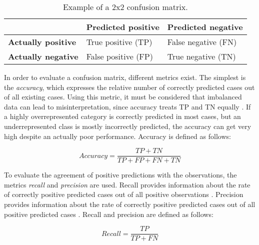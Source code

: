 \begin{table}[H]
\begin{center}
\caption[Example of a 2x2 confusion matrix]{Example of a 2x2 confusion matrix.}
\label{table:conf_matrix_example}
\begin{tabularx}{0.5\textwidth} {
    | >{\centering\arraybackslash}X 
    | >{\centering\arraybackslash}X 
    | >{\centering\arraybackslash}X | }
\hline
& \textbf{Predicted \break positive} & \textbf{Predicted \break negative} \\
\hline
\textbf{Actually \break positive} &
\cellcolor[HTML]{CCFFCC} True positive (TP) & %
\cellcolor[HTML]{FFCCCC} False negative (FN) \\  %
\hline
\textbf{Actually \break negative} &
\cellcolor[HTML]{FFCCCC} False positive (FP) &  %
\cellcolor[HTML]{CCFFCC} True negative (TN) \\ %
\hline
\end{tabularx}
\end{center}
\end{table}

In order to evaluate a confusion matrix, different metrics exist. The simplest is the \textit{accuracy}, which expresses the relative number of correctly predicted cases out of all existing cases. Using this metric, it must be considered that imbalanced data can lead to misinterpretation, since accuracy treats TP and TN equally \parencite{maratea2014adjusted}. If a highly overrepresented category is correctly predicted in most cases, but an underrepresented class is mostly incorrectly predicted, the accuracy can get very high despite an actually poor performance. Accuracy is defined as follows:

\begin{equation}
Accuracy = \frac{TP + TN}{TP + FP + FN + TN}
\end{equation}

\vspace{1\baselineskip}

To evaluate the agreement of positive predictions with the observations, the metrics \textit{recall} and \textit{precision} are used. Recall provides information about the rate of correctly positive predicted cases out of all positive observations \parencite{powers2011evaluation}. Precision provides information about the rate of correctly positive predicted cases out of all positive predicted cases \parencite{powers2011evaluation}. Recall and precision are defined as follows:

\begin{equation}
Recall = \frac{TP}{TP + FN}
\end{equation}

